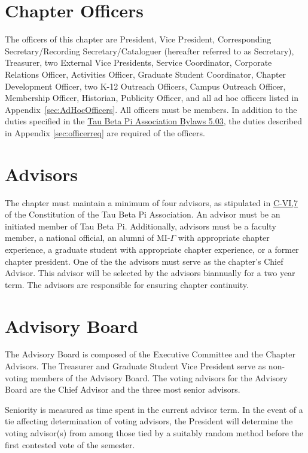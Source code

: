 \section{Chapter Officers} The officers of this chapter are  President, Vice President, Corresponding Secretary/Recording Secretary/Cataloguer 
(hereafter referred to as Secretary), Treasurer, two External Vice Presidents,
 Service Coordinator, Corporate Relations Officer, Activities Officer,  Graduate Student Coordinator, Chapter Development Officer, two K-12 Outreach
 Officers, Campus Outreach Officer, Membership Officer, 
Historian, Publicity Officer, and all ad hoc officers listed in Appendix~\ref{sec:AdHocOfficers}.  All officers must be  members. In addition to the duties specified in the \href{http://www.tbp.org/off/ConstBylaw.pdf}{Tau Beta Pi Association Bylaws 5.03}, the duties described in Appendix \ref{sec:officerreq} are required of the officers.

\section{Advisors}\label{sec:advisors} The chapter must maintain a minimum of four advisors, as stipulated in \href{http://www.tbp.org/off/ConstBylaw.pdf}{C-VI,7} of the Constitution of the Tau Beta Pi Association. An advisor must be an initiated member of Tau Beta Pi. Additionally, advisors must be a faculty member, %
a national official, %
an alumni of MI-$\Gamma$ with appropriate chapter experience, a graduate student with appropriate chapter experience, or a former chapter president. One of the the advisors must serve as the chapter's Chief Advisor. This advisor will be selected by the advisors biannually for a two year term. The advisors are responsible for ensuring chapter continuity.

\section{Advisory Board}\label{sec:advbrd} The Advisory Board is composed of the Executive Committee and the Chapter Advisors.  The Treasurer and Graduate Student Vice President serve as  non-voting members of the Advisory Board. The voting advisors for the Advisory Board are the Chief Advisor and the three most senior advisors.
\begin{enumsubsection}
\itemnotoc Seniority is measured as time spent in the current advisor term.
\itemnotoc In the event of a tie affecting determination of voting advisors, the President will determine the voting advisor(s) from among those tied by a suitably random method before the first contested vote of the semester.
\end{enumsubsection}

